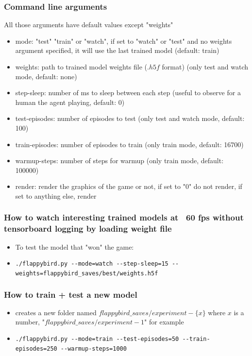 \documentclass[a4paper,10pt,openany,oneside]{report}
\begin{document}
\subsubsection*{Command line arguments}
All those arguments have default values except "weights"
\begin{itemize}
\item  mode: "test" "train" or "watch", if set to "watch" or "test" and no weights argument specified, it will use the last trained model (default: train)
\item  weights: path to trained model weights file ($.h5f$ format) (only test and watch mode, default: none)
\item  step-sleep: number of ms to sleep between each step (useful to observe for a human the agent playing, default: 0)
\item  test-episodes: number of episodes to test (only test and watch mode, default: 100)
\item  train-episodes: number of episodes to train (only train mode, default: 16700)
\item  warmup-steps: number of steps for warmup (only train mode, default: 100000)
\item  render: render the graphics of the game or not, if set to "0" do not render, if set to anything else, render
\end{itemize}
\subsubsection*{How to watch interesting trained models at ~60 fps without tensorboard logging by loading weight file}
\begin{itemize}
	\item To test the model that "won" the game:
	\item \lstinline{./flappybird.py --mode=watch --step-sleep=15 --weights=flappybird_saves/best/weights.h5f}
\end{itemize}
\subsubsection*{How to train + test a new model}
\begin{itemize}
	\item creates a new folder named $flappybird\_saves/experiment-\{x\}$ where $x$ is a number, "$flappybird\_saves/experiment-1$" for example
	\item \lstinline{./flappybird.py --mode=train --test-episodes=50 --train-episodes=250 --warmup-steps=1000}
\end{itemize}
\end{document}
